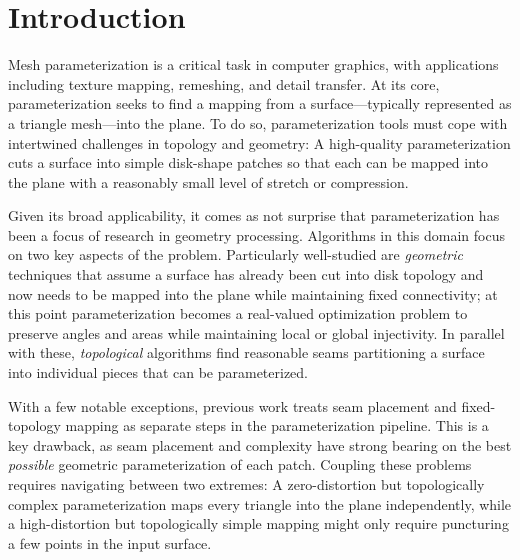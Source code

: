 
\section{Introduction}

Mesh parameterization is a critical task in computer graphics, with applications including texture mapping, remeshing, and detail transfer.  At its core, parameterization seeks to find a mapping from a surface---typically represented as a triangle mesh---into the plane.  To do so, parameterization tools must cope with intertwined challenges in topology and geometry:  A high-quality parameterization cuts a surface into simple disk-shape patches so that each can be mapped into the plane with a reasonably small level of stretch or compression.

Given its broad applicability, it comes as not surprise that parameterization has been a focus of research in geometry processing.  Algorithms in this domain focus on two key aspects of the problem.  Particularly well-studied are \emph{geometric} techniques that assume a surface has already been cut into disk topology and now needs to be mapped into the plane while maintaining fixed connectivity; at this point parameterization becomes a real-valued optimization problem to preserve angles and areas while maintaining local or global injectivity.  In parallel with these, \emph{topological} algorithms find reasonable seams partitioning a surface into individual pieces that can be parameterized.  


With a few notable exceptions, previous work treats seam placement and fixed-topology mapping as separate steps in the parameterization pipeline.  This is a key drawback, as seam placement and complexity have strong bearing on the best \emph{possible} geometric parameterization of each patch.  Coupling these problems requires navigating between two extremes:  A zero-distortion but topologically complex parameterization maps every triangle into the plane independently, while a high-distortion but topologically simple mapping might only require puncturing a few points in the input surface.

